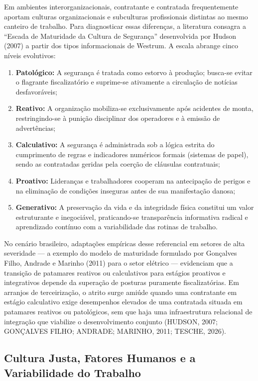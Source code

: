 \documentclass[12pt,a4paper]{article}
\begin{document}
Em ambientes interorganizacionais, contratante e contratada frequentemente aportam culturas organizacionais e subculturas profissionais distintas ao mesmo canteiro de trabalho. Para diagnosticar essas diferenças, a literatura consagra a ``Escada de Maturidade da Cultura de Segurança'' desenvolvida por Hudson (2007) a partir dos tipos informacionais de Westrum. A escala abrange cinco níveis evolutivos:
\begin{enumerate}[label=\alph*)]
  \item \textbf{Patológico:} A segurança é tratada como estorvo à produção; busca-se evitar o flagrante fiscalizatório e suprime-se ativamente a circulação de notícias desfavoráveis;
  \item \textbf{Reativo:} A organização mobiliza-se exclusivamente após acidentes de monta, restringindo-se à punição disciplinar dos operadores e à emissão de advertências;
  \item \textbf{Calculativo:} A segurança é administrada sob a lógica estrita do cumprimento de regras e indicadores numéricos formais (sistemas de papel), sendo as contratadas geridas pela coerção de cláusulas contratuais;
  \item \textbf{Proativo:} Lideranças e trabalhadores cooperam na antecipação de perigos e na eliminação de condições inseguras antes de sua manifestação danosa;
  \item \textbf{Generativo:} A preservação da vida e da integridade física constitui um valor estruturante e inegociável, praticando-se transparência informativa radical e aprendizado contínuo com a variabilidade das rotinas de trabalho.
\end{enumerate}

No cenário brasileiro, adaptações empíricas desse referencial em setores de alta severidade — a exemplo do modelo de maturidade formulado por Gonçalves Filho, Andrade e Marinho (2011) para o setor elétrico — evidenciam que a transição de patamares reativos ou calculativos para estágios proativos e integrativos depende da superação de posturas puramente fiscalizatórias. Em arranjos de terceirização, o atrito surge amiúde quando uma contratante em estágio calculativo exige desempenhos elevados de uma contratada situada em patamares reativos ou patológicos, sem que haja uma infraestrutura relacional de integração que viabilize o desenvolvimento conjunto (HUDSON, 2007; GONÇALVES FILHO; ANDRADE; MARINHO, 2011; TESCHE, 2026).

\subsection{Cultura Justa, Fatores Humanos e a Variabilidade do Trabalho}
\end{document}
